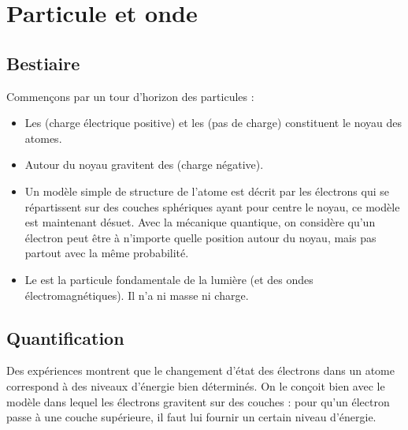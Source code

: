 \documentclass[11pt,class=report,crop=false]{standalone}
\begin{document}


\section{Particule et onde}

\subsection{Bestiaire}

Commençons par un tour d'horizon des particules :
\begin{itemize}
  \item Les  (charge électrique positive) et les  (pas de charge) constituent le noyau des atomes.

  \item Autour du noyau gravitent des  (charge négative). 

  \item Un modèle simple de structure de l'atome est décrit par les électrons qui se répartissent sur des couches sphériques ayant pour centre le noyau, ce modèle est maintenant désuet. Avec la mécanique quantique, on considère qu'un électron peut être à n'importe quelle position  autour du noyau, mais pas partout avec la même probabilité.


  \item Le  est la particule fondamentale de la lumière (et des ondes électromagnétiques). Il n'a ni masse ni charge.
\end{itemize}


\subsection{Quantification}

Des expériences montrent que le changement d'état des électrons dans un atome correspond à des niveaux d'énergie bien déterminés.
On le conçoit bien avec le modèle dans lequel les électrons gravitent sur des couches : pour qu'un électron passe à une couche supérieure, il faut lui fournir un certain niveau d'énergie.
\end{document}
